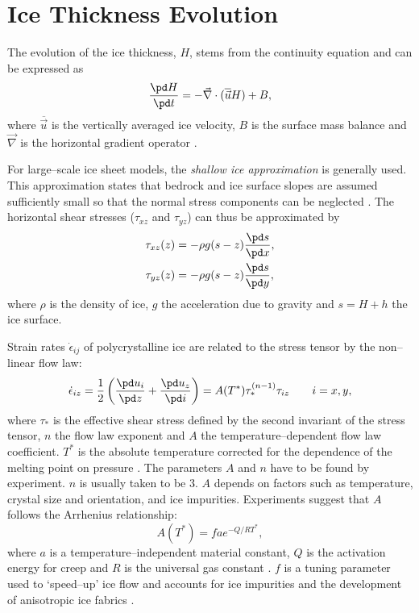 \section{Ice Thickness Evolution}
The evolution of the ice thickness, $H$, stems from the continuity equation and can be expressed as
\begin{equation}
  \label{kin.eq.ice_thickness}
  \frac{\pd H}{\pd t} = -\vec\nabla\cdot(\overline{\vec{u}} H) + B,
\end{equation}
where $\overline{\vec{u}}$ is the vertically averaged ice velocity, $B$ is the surface mass balance and $\vec\nabla$ is the horizontal gradient operator \citep{Payne1997}. 

For large--scale ice sheet models, the \emph{shallow ice approximation} is generally used. This approximation states that bedrock and ice surface slopes are assumed sufficiently small so that the normal stress components can be neglected \citep{Hutter1983}. The horizontal shear stresses ($\tau_{xz}$ and $\tau_{yz}$) can thus be approximated by
\begin{equation}
  \label{kin.eq.horiz_shear}
  \begin{split}
    \tau_{xz}(z)&=-\rho g(s-z)\frac{\pd s}{\pd x},\\
    \tau_{yz}(z)&=-\rho g(s-z)\frac{\pd s}{\pd y},
  \end{split}
\end{equation}
where $\rho$ is the density of ice, $g$ the acceleration due to gravity and $s=H+h$ the ice surface.

Strain rates $\dot{\epsilon}_{ij}$ of polycrystalline ice are related to the stress tensor by the non--linear flow law:
\begin{equation}
  \label{kin.eq.flowlaw}
  \dot{\epsilon}_{iz}=\frac12\left(\frac{\pd u_i}{\pd z}+\frac{\pd u_z}{\pd i}\right)=A(T^\ast)\tau_\ast^{(n-1)}\tau_{iz}\qquad i=x,y,
\end{equation}
where $\tau_\ast$ is the effective shear stress defined by the second invariant of the stress tensor, $n$ the flow law exponent and $A$ the temperature--dependent flow law coefficient. $T^\ast$ is the absolute temperature corrected for the dependence of the melting point on pressure \cite[$T^\ast=T+8.7\cdot10^{-4}(H+h-z)$, $T$ in Kelvin,][]{Huybrechts1986}. The parameters $A$ and $n$ have to be found by experiment. $n$ is usually taken to be 3. $A$ depends on factors such as temperature, crystal size and orientation, and ice impurities. Experiments suggest that $A$ follows the Arrhenius relationship:
\begin{equation}
  \label{kin.eq.arrhenius}
  A(T^\ast)=fae^{-Q/RT^\ast},
\end{equation}where $a$ is a temperature--independent material constant, $Q$ is the activation energy for creep and $R$ is the universal gas constant \citep{Paterson1994}. $f$ is a tuning parameter used to `speed--up' ice flow and accounts for ice impurities and the development of anisotropic ice fabrics \citep{Payne1999,Tarasov1999,Tarasov2000,Peltier2000}.


